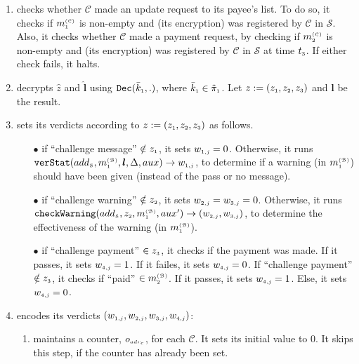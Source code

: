 \begin{enumerate}[leftmargin=.46cm]
\begin{enumerate}
\item  checks whether $\mathcal C$ made an update request to its payee's list. To do so, it checks if  $m_{\scriptscriptstyle 1}^{\scriptscriptstyle(\mathcal C)}$  is non-empty and (its encryption) was registered by $\mathcal{C}$ in $\mathcal{S}$. Also, it checks whether $\mathcal C$ made a payment request, by checking if $m_{\scriptscriptstyle 2}^{\scriptscriptstyle(\mathcal C)}$ is non-empty and (its encryption) was registered by $\mathcal{C}$ in $\mathcal{S}$ at time $t_{\scriptscriptstyle 3}$.  If either check fails, it halts. 
\item decrypts $\hat z$ and $\hat{\bm{l}}$ using $\mathtt{Dec}(\bar k_{\scriptscriptstyle 1},.)$, where $\bar k_{\scriptscriptstyle 1}\in\ddot \pi_{\scriptscriptstyle 1}$. Let $ z:=(z_{\scriptscriptstyle 1}, z_{\scriptscriptstyle 2}, z_{\scriptscriptstyle 3})$ and ${\bm{l}}$ be the result. 
%
\item\label{auditors-verdict} sets its verdicts according to  $z:=(z_{\scriptscriptstyle 1}, z_{\scriptscriptstyle 2}, z_{\scriptscriptstyle 3})$ as follows.  
%
\begin{itemize}

%
\item[$\bullet$]  if  ``challenge message'' $\notin z_{\scriptscriptstyle 1}$, it sets $w_{\scriptscriptstyle 1,j}= 0$. Otherwise,  it runs $\mathtt{verStat}(add_{\scriptscriptstyle\mathcal{S}}, m_{\scriptscriptstyle 1}^{\scriptscriptstyle(\mathcal{B})},  \bm{l}, \Delta, {aux})\rightarrow w_{\scriptscriptstyle 1, j}$, to determine if a warning (in $m_{\scriptscriptstyle 1}^{\scriptscriptstyle(\mathcal{B})}$) should have been given (instead of the pass or no message). %
%

\item[$\bullet$]  if ``challenge warning'' $\notin z_{\scriptscriptstyle 2}$, it sets $w_{\scriptscriptstyle 2, j}= w_{\scriptscriptstyle 3, j}= 0$.  Otherwise, it runs $\mathtt{checkWarning}(add_{\scriptscriptstyle\mathcal{S}}, z_{\scriptscriptstyle 2}, m_{\scriptscriptstyle 1}^{\scriptscriptstyle(\mathcal{B})},  {aux}')\rightarrow (w_{\scriptscriptstyle 2, j}, w_{\scriptscriptstyle 3, j})$, to determine the effectiveness of the warning (in $m_{\scriptscriptstyle 1}^{\scriptscriptstyle(\mathcal{B})}$). %



\item[$\bullet$]  if ``challenge payment'' $\in z_{\scriptscriptstyle 3}$, it checks if the  payment was  made.   If it passes, it sets  $w_{\scriptscriptstyle 4, j}=1$. If it failes,   it sets $w_{\scriptscriptstyle 4, j}=0$.  If ``challenge payment'' $\notin z_{\scriptscriptstyle 3}$, it checks if  ``paid''  $\in{m}_{\scriptscriptstyle 2}^{\scriptscriptstyle(\mathcal B)}$. If it passes, it sets $w_{\scriptscriptstyle 4, j}=1$. Else, it sets $w_{\scriptscriptstyle 4, j}=0$. 
%
\end{itemize}
%
\item  encodes  its verdicts $(w_{\scriptscriptstyle 1, j}, w_{\scriptscriptstyle 2, j}, w_{\scriptscriptstyle 3, j},  w_{\scriptscriptstyle 4, j})$: 
%
\begin{enumerate}
%
\item maintains a counter, $o_{\scriptscriptstyle adr_{\scriptscriptstyle{c}}}$,  for each $\mathcal{C}$. It sets its initial value to $0$. It skips this step, if the counter has already been set. 
%


\end{enumerate}
\end{enumerate}
\end{enumerate}
